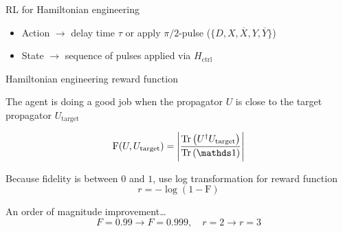 \documentclass{beamer}
\begin{document}
\begin{frame}{RL for Hamiltonian engineering}
%

\begin{itemize}
    \item Action $\to$ delay time $\tau$ or apply $\pi/2$-pulse ($\{ D, X, \overline{X}, Y, \overline{Y} \}$)
    \item State $\to$ sequence of pulses applied via $H_{\text{ctrl}}$
\end{itemize}

\begin{figure}
    \centering
    \scalebox{.6}{
    
    }
\end{figure}




\end{frame}


\begin{frame}{Hamiltonian engineering reward function}
%

The agent is doing a good job when the propagator $U$ is close to the target propagator $U_\text{target}$

\[
\text{F}(U, U_\text{target}) = \left| \frac{\Tr{
    U^\dagger U_\text{target}
}}{\Tr{\identity}} \right|
\]

Because fidelity is between $0$ and $1$, use log transformation for reward function
\[
r = -\log(1 - \text{F})
\]

An order of magnitude improvement\dots
\[
F=0.99 \to F=0.999, \quad r=2 \to r=3
\]

\end{frame}
\end{document}
